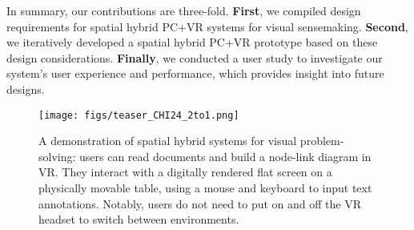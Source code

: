 In summary, our contributions are three-fold.
\textbf{First}, we compiled design requirements for spatial hybrid PC+VR systems for visual sensemaking. 
\textbf{Second}, we iteratively developed a spatial hybrid PC+VR prototype based on these design considerations. 
\textbf{Finally}, we conducted a  user study to investigate our system's user experience and performance, which provides insight into future designs.




\begin{figure}
\centering
\texttt{[image: figs/teaser\_CHI24\_2to1.png]}
\caption{A demonstration of spatial hybrid systems for visual problem-solving: users can read documents and build a node-link diagram in VR. They interact with a digitally rendered flat screen on a physically movable table, using a mouse and keyboard to input text annotations. Notably, users do not need to put on and off the VR headset to switch between environments.}
\label{fig:teaser}
\end{figure}

